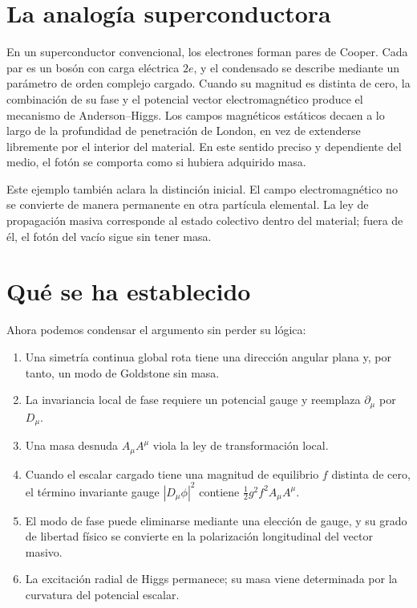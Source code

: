 \section{La analogía superconductora}

En un superconductor convencional, los electrones forman pares de Cooper. Cada par es un bosón con carga eléctrica \(2e\), y el condensado se describe mediante un parámetro de orden complejo cargado. Cuando su magnitud es distinta de cero, la combinación de su fase y el potencial vector electromagnético produce el mecanismo de Anderson--Higgs. Los campos magnéticos estáticos decaen a lo largo de la profundidad de penetración de London, en vez de extenderse libremente por el interior del material. En este sentido preciso y dependiente del medio, el fotón se comporta como si hubiera adquirido masa.

Este ejemplo también aclara la distinción inicial. El campo electromagnético no se convierte de manera permanente en otra partícula elemental. La ley de propagación masiva corresponde al estado colectivo dentro del material; fuera de él, el fotón del vacío sigue sin tener masa.

\section{Qué se ha establecido}

Ahora podemos condensar el argumento sin perder su lógica:
\begin{enumerate}
  \item Una simetría continua global rota tiene una dirección angular plana y, por tanto, un modo de Goldstone sin masa.
  \item La invariancia local de fase requiere un potencial gauge y reemplaza \(\partial_\mu\) por \(D_\mu\).
  \item Una masa desnuda \(A_\mu A^\mu\) viola la ley de transformación local.
  \item Cuando el escalar cargado tiene una magnitud de equilibrio \(f\) distinta de cero, el término invariante gauge \(|D_\mu\phi|^2\) contiene \(\frac12g^2f^2A_\mu A^\mu\).
  \item El modo de fase puede eliminarse mediante una elección de gauge, y su grado de libertad físico se convierte en la polarización longitudinal del vector masivo.
  \item La excitación radial de Higgs permanece; su masa viene determinada por la curvatura del potencial escalar.
\end{enumerate}

